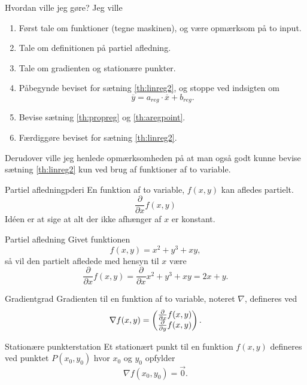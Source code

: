 \documentclass{article}
\begin{document}
\begin{eksempel*}{Hvordan ville jeg gøre?}
	Jeg ville
	\begin{enumerate}
		\item Først tale om funktioner (tegne maskinen), og være opmærksom på
			to input.
		\item Tale om definitionen på partiel afledning.
		\item Tale om gradienten og stationære punkter.
		\item Påbegynde beviset for sætning \ref{th:linreg2}, og stoppe ved
			indsigten om
			\[
				\overline{y} = a_{reg} \cdot \overline{x} + b_{reg}.
			\] 
		\item Bevise sætning \ref{th:propreg} og \ref{th:aregpoint}.
		\item Færdiggøre beviset for sætning \ref{th:linreg2}.
	\end{enumerate}
	Derudover ville jeg henlede opmærksomheden på at man også godt kunne bevise
	sætning \ref{th:linreg2} kun ved brug af funktioner af to variable.
\end{eksempel*}

\begin{definition}{Partiel afledning}{pderi}
	En funktion af to variable, $f(x, y)$ kan afledes partielt.
	\[
		\frac{\partial}{\partial x} f(x, y)
	\] 
	Id\'een er at sige at alt der ikke afhænger af $x$ er konstant.
\end{definition}

\begin{eksempel*}{Partiel afledning}{}
	Givet funktionen
	\[
		f(x, y) = x^2 + y^3 + xy,
	\] 
	så vil den partielt afledede med hensyn til $x$ være
	\[
		\frac{\partial}{\partial x}f(x, y) = \frac{\partial}{\partial x} x^2 + y^3 + xy = 2x + y.
	\] 
\end{eksempel*}

\begin{definition}{Gradient}{grad}
	Gradienten til en funktion af to variable, noteret $\nabla$, defineres ved
	\[
		\nabla f(x, y) =  \begin{pmatrix} \frac{\partial}{\partial x}f(x, y)\\ \frac{\partial}{\partial y}f(x, y) \end{pmatrix} .
	\] 
\end{definition}

\begin{definition}{Stationære punkter}{station}
	Et stationært punkt til en funktion $f(x, y)$ defineres ved punktet 
	$P(x_0, y_0)$ hvor $x_0$ og $y_0$ opfylder
	\[
		\nabla f(x_0, y_0) = \vec{0}.
	\] 
\end{definition}
\end{document}
